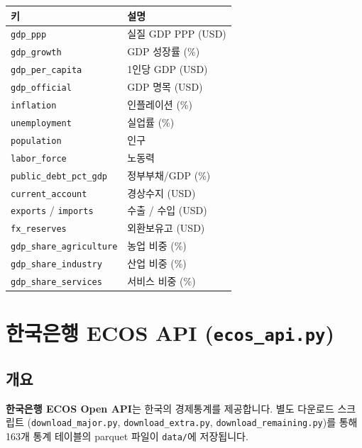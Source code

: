 \documentclass[11pt,a4paper]{article}
\newcommand{\code}[1]{\texttt{#1}}
\newcommand{\file}[1]{\texttt{\textcolor{string}{#1}}}
\begin{document}
\begin{table}[h]
\centering
\begin{tabularx}{\textwidth}{l X}
\toprule
\textbf{키} & \textbf{설명} \\
\midrule
\code{gdp\_ppp}                & 실질 GDP PPP (USD) \\
\code{gdp\_growth}             & GDP 성장률 (\%) \\
\code{gdp\_per\_capita}        & 1인당 GDP (USD) \\
\code{gdp\_official}           & GDP 명목 (USD) \\
\code{inflation}               & 인플레이션 (\%) \\
\code{unemployment}            & 실업률 (\%) \\
\code{population}              & 인구 \\
\code{labor\_force}            & 노동력 \\
\code{public\_debt\_pct\_gdp}  & 정부부채/GDP (\%) \\
\code{current\_account}        & 경상수지 (USD) \\
\code{exports} / \code{imports}& 수출 / 수입 (USD) \\
\code{fx\_reserves}            & 외환보유고 (USD) \\
\code{gdp\_share\_agriculture} & 농업 비중 (\%) \\
\code{gdp\_share\_industry}    & 산업 비중 (\%) \\
\code{gdp\_share\_services}    & 서비스 비중 (\%) \\
\bottomrule
\end{tabularx}
\end{table}


\section{한국은행 ECOS API (\file{ecos\_api.py})}

\subsection{개요}

\textbf{한국은행 ECOS Open API}는 한국의 경제통계를 제공합니다.
별도 다운로드 스크립트 (\file{download\_major.py}, \file{download\_extra.py}, \file{download\_remaining.py})를
통해 163개 통계 테이블의 parquet 파일이 \file{data/}에 저장됩니다.
\end{document}
